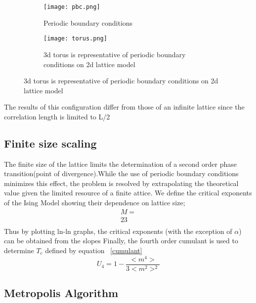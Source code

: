 \documentclass[12pt]{article}
\begin{document}
\begin{figure}[h!]
        \centering
        \begin{subfigure}[b]{0.45\textwidth}
                \texttt{[image: pbc.png]}
                \caption{Periodic boundary conditions}
                \label{pbc}
        \end{subfigure}
        \begin{subfigure}[b]{0.45\textwidth}
                \texttt{[image: torus.png]}
                \caption{3d torus is representative of periodic boundary conditions on 2d lattice model}
                \label{torus}
        \end{subfigure}
\end{figure}

The results of this configuration differ from those of an infinite lattice since the correlation length is limited to L/2 \cite{Landau}


\subsection{Finite size scaling}
The finite size of the lattice limits the determination of a second order phase transition(point of divergence).While the use of periodic boundary conditions minimizes this effect, the problem is resolved by extrapolating the theoretical value given the limited resource of a finite attice\cite{Kotze}. We define the critical exponents of the Ising Model showing their dependence on lattice size;
\begin{eqnarray}
M = \\
23 \\

\end{eqnarray}
Thus by plotting ln-ln graphs, the critical exponents (with the exception of $\alpha$) can be obtained from the slopes
Finally, the fourth order cumulant \cite{Ising}  is used to determine $T_c$ defined by equation ~\ref{cumulant}
\begin{equation}\label{cumulant}
U_4 = 1 - \frac{<m^4>}{3<m^2>^2}
\end{equation}
\subsection{Metropolis Algorithm}
\end{document}
